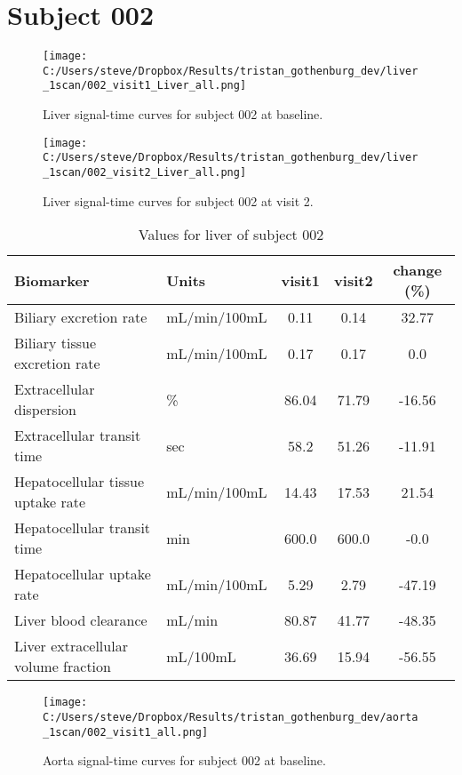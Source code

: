 \documentclass{epflreport}%
\begin{document}
%
\clearpage%
\section{Subject 002}%
\label{sec:Subject002}%


\begin{figure}[h!]%
\centering%
\texttt{[image: C:/Users/steve/Dropbox/Results/tristan\_gothenburg\_dev/liver\_1scan/002\_visit1\_Liver\_all.png]}%
\caption{Liver signal{-}time curves for subject 002 at baseline.}%
\end{figure}

%


\begin{figure}[h!]%
\centering%
\texttt{[image: C:/Users/steve/Dropbox/Results/tristan\_gothenburg\_dev/liver\_1scan/002\_visit2\_Liver\_all.png]}%
\caption{Liver signal{-}time curves for subject 002 at visit 2.}%
\end{figure}

%


\begin{table}[h!]%
\centering%
\begin{tabular}{llccc}%
\hline%
Biomarker&Units&visit1&visit2&change (\%)\\%
\hline%
Biliary excretion rate&mL/min/100mL&0.11&0.14&32.77\\%
Biliary tissue excretion rate&mL/min/100mL&0.17&0.17&0.0\\%
Extracellular dispersion&\%&86.04&71.79&{-}16.56\\%
Extracellular transit time&sec&58.2&51.26&{-}11.91\\%
Hepatocellular tissue uptake rate&mL/min/100mL&14.43&17.53&21.54\\%
Hepatocellular transit time&min&600.0&600.0&{-}0.0\\%
Hepatocellular uptake rate&mL/min/100mL&5.29&2.79&{-}47.19\\%
Liver blood clearance&mL/min&80.87&41.77&{-}48.35\\%
Liver extracellular volume fraction&mL/100mL&36.69&15.94&{-}56.55\\%
\hline%
\end{tabular}%
\caption{Values for liver of subject 002}%
\end{table}

%
\clearpage%


\begin{figure}[h!]%
\centering%
\texttt{[image: C:/Users/steve/Dropbox/Results/tristan\_gothenburg\_dev/aorta\_1scan/002\_visit1\_all.png]}%
\caption{Aorta signal{-}time curves for subject 002 at baseline.}%
\end{figure}
\end{document}
